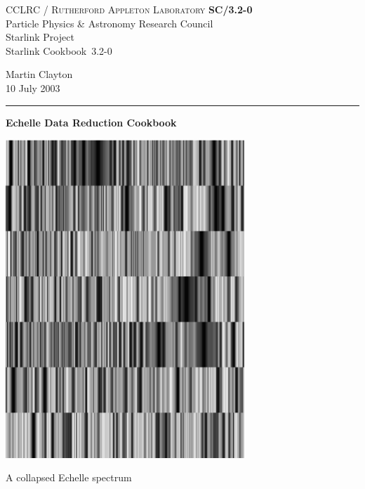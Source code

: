 \documentclass[twoside,11pt]{article}
\newcommand{\stardoccategory}  {Starlink Cookbook}
\newcommand{\stardocinitials}  {SC}
\newcommand{\stardocnumber}    {3.2-0} %
\newcommand{\stardocauthors}   {Martin Clayton}
\newcommand{\stardocdate}      {10 July 2003}
\newcommand{\stardoctitle}     {Echelle Data Reduction Cookbook}
\newcommand{\stardocname}{\stardocinitials /\stardocnumber}
\newenvironment{latexonly}{}{}
\renewcommand{\_}{\texttt{\symbol{95}}}
\begin{document}
\thispagestyle{empty}

\begin{latexonly}
   CCLRC / \textsc{Rutherford Appleton Laboratory} \hfill \textbf{\stardocname}\\
   {\large Particle Physics \& Astronomy Research Council}\\
   {\large Starlink Project\\}
   {\large \stardoccategory\ \stardocnumber}
   \begin{flushright}
   \stardocauthors\\
   \stardocdate
   \end{flushright}
   \vspace{-4mm}
   \rule{\textwidth}{0.5mm}
   \vspace{5mm}
   \begin{center}
   {\Huge\textbf{\stardoctitle \\ [2.5ex]}}
   \end{center}
   \vspace{5mm}

   \begin{center}
   \includegraphics[height=120mm]{sc3_cover.eps}

   A collapsed Echelle spectrum
   \end{center}

\end{latexonly}
\end{document}
